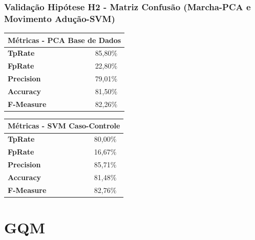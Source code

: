 \documentclass{beamer}
\begin{document}
\begin{frame}
   \frametitle{Validação Hipótese H2 - Matriz Confusão (Marcha-PCA e Movimento Adução-SVM)}
		\begin{block}{}
				\begin{table}
				\label{table:metricasmatrizconfusaosvm}
				\centering
				\begin{tabular}{|l|r|}
				\hline
				\multicolumn{2}{|l|}{\textbf{Métricas - PCA Base de Dados}} \\ \hline
				\textbf{TpRate}                    & 85,80$\%$\                 \\ \hline
				\textbf{FpRate}                    & 22,80$\%$\                \\ \hline
				\textbf{Precision}                 & 79,01$\%$\                \\ \hline
				\textbf{Accuracy}                  & 81,50$\%$\                \\ \hline
				\textbf{F-Measure}                 & 82,26$\%$\                \\ \hline
				\end{tabular}
				\end{table}
    \end{block} 
	
	\begin{block}{}
   		\begin{table}[!htbp]
				\label{table:metricasmatrizconfusao}
				\centering
				\begin{tabular}{|l|r|}
				\hline
				\multicolumn{2}{|l|}{\textbf{Métricas - SVM Caso-Controle}} \\ \hline
				\textbf{TpRate}                    & 80,00$\%$\                 \\ \hline
				\textbf{FpRate}                    & 16,67$\%$\                \\ \hline
				\textbf{Precision}                 & 85,71$\%$\                \\ \hline
				\textbf{Accuracy}                  & 81,48$\%$\                \\ \hline
				\textbf{F-Measure}                 & 82,76$\%$\                \\ \hline
				\end{tabular}
				\end{table}
	\end{block}

\end{frame}

\section{GQM}
\end{document}
